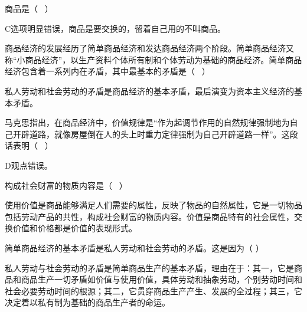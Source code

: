 \question 商品是（ ~）
\par{}
\begin{solution}C选项明显错误，商品是要交换的，留着自己用的不叫商品。
\end{solution}
\question 商品经济的发展经历了简单商品经济和发达商品经济两个阶段。简单商品经济又称``小商品经济''，以生产资料个体所有制和个体劳动为基础的商品经济。简单商品经济包含着一系列内在矛盾，其中最基本的矛盾是（
~）
\par{}
\begin{solution}私人劳动和社会劳动的矛盾是商品经济的基本矛盾，最后演变为资本主义经济的基本矛盾。
\end{solution}
\question 马克思指出，在商品经济中，价值规律是``作为起调节作用的自然规律强制地为自己开辟道路，就像房屋倒在人的头上时重力定律强制为自己开辟道路一样''。这段话表明（
~）
\par{}
\begin{solution}D观点错误。
\end{solution}
\question 构成社会财富的物质内容是（ ~）
\par{}
\begin{solution}使用价值是商品能够满足人们需要的属性，反映了物品的自然属性，它是一切物品包括劳动产品的共性，构成社会财富的物质内容。价值是商品特有的社会属性，交换价值和价格都是价值的表现形式。
\end{solution}
\question 简单商品经济的基本矛盾是私人劳动和社会劳动的矛盾。这是因为（ ）
\par{}
\begin{solution}私人劳动与社会劳动的矛盾是简单商品生产的基本矛盾，理由在于：其一，它是商品和商品生产一切矛盾如价值与使用价值，具体劳动和抽象劳动，个别劳动时间和社会必要劳动时间的根源；其二，它贯穿商品生产产生、发展的全过程；其三，它决定着以私有制为基础的商品生产者的命运。
\end{solution}
